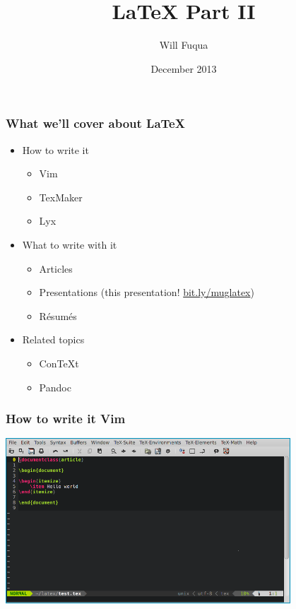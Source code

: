 \documentclass{beamer}
\author{Will Fuqua}
\title{\LaTeX{} Part II}
\institute{Michigan!/usr/group}
\date{December 2013}
\begin{document}
\begin{frame}[t,plain]
    \titlepage
\end{frame}

\begin{frame}
    \frametitle{What we'll cover about \LaTeX}
    \begin{itemize}
        \item How to write it
            \begin{itemize}
                \item Vim
                \item TexMaker
                \item Lyx
            \end{itemize}
            \pause
        \item What to write with it
            \begin{itemize}
                \item Articles
                \item Presentations 
                    (this presentation! \href{http://bit.ly/muglatex}{bit.ly/muglatex})
                \item R\'{e}sum\'{e}s
            \end{itemize}
            \pause
        \item Related topics
            \begin{itemize}
                \item ConTeXt
                \item Pandoc
            \end{itemize}
    \end{itemize}
\end{frame}

\begin{frame}
    \frametitle{How to write it \textendash{} Vim}
    \begin{center}
        \includegraphics[width=0.8\textwidth]{img/vim.png}
    \end{center}
\end{frame}
\end{document}
